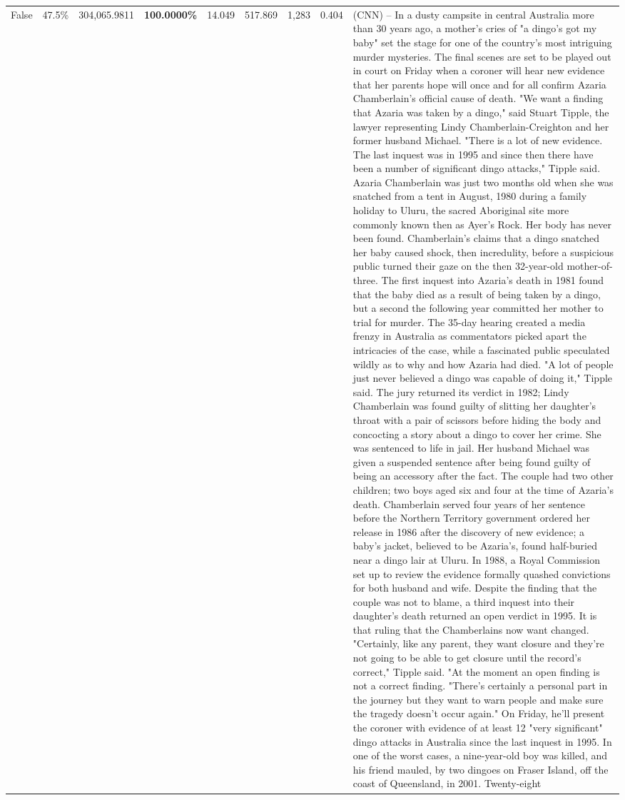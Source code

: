 \begin{table}[H]
\begin{tabular}{lllrlllll}
False & 47.5\% & \color{red} 304,065.9811 & \bfseries \color{red} 100.0000\% & 14.049 & 517.869 & 1,283 & 0.404 & (CNN) -- In a dusty campsite in central Australia more than 30 years ago, a mother's cries of "a dingo's got my baby" set the stage for one of the country's most intriguing murder mysteries. The final scenes are set to be played out in court on Friday when a coroner will hear new evidence that her parents hope will once and for all confirm Azaria Chamberlain's official cause of death. "We want a finding that Azaria was taken by a dingo," said Stuart Tipple, the lawyer representing Lindy Chamberlain-Creighton and her former husband Michael. "There is a lot of new evidence. The last inquest was in 1995 and since then there have been a number of significant dingo attacks," Tipple said. Azaria Chamberlain was just two months old when she was snatched from a tent in August, 1980 during a family holiday to Uluru, the sacred Aboriginal site more commonly known then as Ayer's Rock. Her body has never been found. Chamberlain's claims that a dingo snatched her baby caused shock, then incredulity, before a suspicious public turned their gaze on the then 32-year-old mother-of-three. The first inquest into Azaria's death in 1981 found that the baby died as a result of being taken by a dingo, but a second the following year committed her mother to trial for murder. The 35-day hearing created a media frenzy in Australia as commentators picked apart the intricacies of the case, while a fascinated public speculated wildly as to why and how Azaria had died. "A lot of people just never believed a dingo was capable of doing it," Tipple said. The jury returned its verdict in 1982; Lindy Chamberlain was found guilty of slitting her daughter's throat with a pair of scissors before hiding the body and concocting a story about a dingo to cover her crime. She was sentenced to life in jail. Her husband Michael was given a suspended sentence after being found guilty of being an accessory after the fact. The couple had two other children; two boys aged six and four at the time of Azaria's death. Chamberlain served four years of her sentence before the Northern Territory government ordered her release in 1986 after the discovery of new evidence; a baby's jacket, believed to be Azaria's, found half-buried near a dingo lair at Uluru. In 1988, a Royal Commission set up to review the evidence formally quashed convictions for both husband and wife. Despite the finding that the couple was not to blame, a third inquest into their daughter's death returned an open verdict in 1995. It is that ruling that the Chamberlains now want changed. "Certainly, like any parent, they want closure and they're not going to be able to get closure until the record's correct," Tipple said. "At the moment an open finding is not a correct finding. "There's certainly a personal part in the journey but they want to warn people and make sure the tragedy doesn't occur again." On Friday, he'll present the coroner with evidence of at least 12 "very significant" dingo attacks in Australia since the last inquest in 1995. In one of the worst cases, a nine-year-old boy was killed, and his friend mauled, by two dingoes on Fraser Island, off the coast of Queensland, in 2001. Twenty-eight 
\end{tabular}
\end{table}
